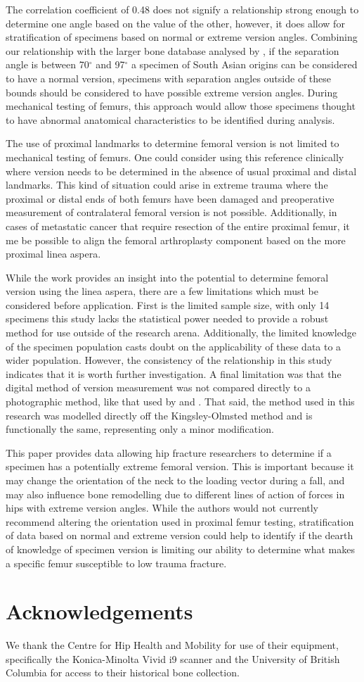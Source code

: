 The correlation coefficient of 0.48 does not signify a relationship strong enough to determine one angle based on the value of the other, however, it does allow for stratification of specimens based on normal or extreme version angles.
Combining our relationship with the larger bone database analysed by \citet{jain_anteversion_2003}, if the separation angle is between 70$^\circ$ and 97$^\circ$ a specimen of South Asian origins can be considered to have a normal version, specimens with separation angles outside of these bounds should be considered to have possible extreme version angles.
During mechanical testing of femurs, this approach would allow those specimens thought to have abnormal anatomical characteristics to be identified during analysis.

The use of proximal landmarks to determine femoral version is not limited to mechanical testing of femurs.
One could consider using this reference clinically where version needs to be determined in the absence of usual proximal and distal landmarks.
This kind of situation could arise in extreme trauma where the proximal or distal ends of both femurs have been damaged and preoperative measurement of contralateral femoral version is not possible.
Additionally, in cases of metastatic cancer that require resection of the entire proximal femur, it me be possible to align the femoral arthroplasty component based on the more proximal linea aspera.

While the work provides an insight into the potential to determine femoral version using the linea aspera, there are a few limitations which must be considered before application.
First is the limited sample size, with only 14 specimens this study lacks the statistical power needed to provide a robust method for use outside of the research arena.
Additionally, the limited knowledge of the specimen population casts doubt on the applicability of these data to a wider population.
However, the consistency of the relationship in this study indicates that it is worth further investigation.
A final limitation was that the digital method of version measurement was not compared directly to a photographic method, like that used by \citet{toogood_proximal_2009} and \citet{kingsley_study_1948}.
That said, the method used in this research was modelled directly off the Kingsley-Olmsted method and is functionally the same, representing only a minor modification.

This paper provides data allowing hip fracture researchers to determine if a specimen has a potentially extreme femoral version.
This is important because it may change the orientation of the neck to the loading vector during a fall, and may also influence bone remodelling due to different lines of action of forces in hips with extreme version angles.
While the authors would not currently recommend altering the orientation used in proximal femur testing, stratification of data based on normal and extreme version could help to identify if the dearth of knowledge of specimen version is limiting our ability to determine what makes a specific femur susceptible to low trauma fracture.


\section{Acknowledgements}
\label{sec:version_acknowledge}
We thank the Centre for Hip Health and Mobility for use of their equipment, specifically the Konica-Minolta Vivid i9 scanner and the University of British Columbia for access to their historical bone collection.
